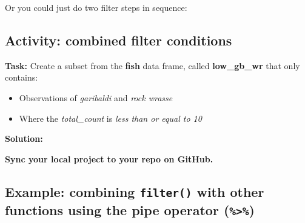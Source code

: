 \documentclass[]{book}
\newenvironment{Shaded}{\begin{snugshade}}{\end{snugshade}}
\newcommand{\CommentTok}[1]{\textcolor[rgb]{0.56,0.35,0.01}{\textit{#1}}}
\newcommand{\DecValTok}[1]{\textcolor[rgb]{0.00,0.00,0.81}{#1}}
\newcommand{\KeywordTok}[1]{\textcolor[rgb]{0.13,0.29,0.53}{\textbf{#1}}}
\newcommand{\NormalTok}[1]{#1}
\newcommand{\OperatorTok}[1]{\textcolor[rgb]{0.81,0.36,0.00}{\textbf{#1}}}
\newcommand{\StringTok}[1]{\textcolor[rgb]{0.31,0.60,0.02}{#1}}
\providecommand{\tightlist}{%
  \setlength{\itemsep}{0pt}\setlength{\parskip}{0pt}}
\begin{document}
Or you could just do two filter steps in sequence:

\begin{Shaded}
\end{Shaded}

\hypertarget{activity-combined-filter-conditions}{%
\subsection{Activity: combined filter conditions}\label{activity-combined-filter-conditions}}

\textbf{Task:} Create a subset from the \textbf{fish} data frame, called \textbf{low\_gb\_wr} that only contains:

\begin{itemize}
\tightlist
\item
  Observations of \emph{garibaldi} and \emph{rock wrasse}
\item
  Where the \emph{total\_count} is \emph{less than or equal to 10}
\end{itemize}

\textbf{Solution:}

\begin{Shaded}
\end{Shaded}

\textbf{Sync your local project to your repo on GitHub.}

\hypertarget{example-combining-filter-with-other-functions-using-the-pipe-operator}{%
\subsection{\texorpdfstring{Example: combining \texttt{filter()} with other functions using the pipe operator (\texttt{\%\textgreater{}\%})}{Example: combining filter() with other functions using the pipe operator (\%\textgreater{}\%)}}\label{example-combining-filter-with-other-functions-using-the-pipe-operator}}
\end{document}
